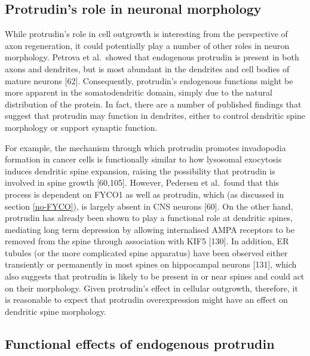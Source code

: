 \documentclass[
  12pt,
  a4paper,
]{book}
\begin{document}
\hypertarget{protrudins-role-in-neuronal-morphology}{%
\subsection{Protrudin's role in neuronal morphology}\label{protrudins-role-in-neuronal-morphology}}

While protrudin's role in cell outgrowth is interesting from the perspective of axon regeneration, it could potentially play a number of other roles in neuron morphology. Petrova et al.~showed that endogenous protrudin is present in both axons and dendrites, but is most abundant in the dendrites and cell bodies of mature neurons {[}62{]}. Consequently, protrudin's endogenous functions might be more apparent in the somatodendritic domain, simply due to the natural distribution of the protein. In fact, there are a number of published findings that suggest that protrudin may function in dendrites, either to control dendritic spine morphology or support synaptic function.

For example, the mechanism through which protrudin promotes invadopodia formation in cancer cells is functionally similar to how lysosomal exocytosis induces dendritic spine expansion, raising the possibility that protrudin is involved in spine growth {[}60,105{]}. However, Pedersen et al.~found that this process is dependent on FYCO1 as well as protrudin, which (as discussed in section \ref{no-FYCO}), is largely absent in CNS neurons {[}60{]}. On the other hand, protrudin has already been shown to play a functional role at dendritic spines, mediating long term depression by allowing internalised AMPA receptors to be removed from the spine through association with KIF5 {[}130{]}. In addition, ER tubules (or the more complicated spine apparatus) have been observed either transiently or permanently in most spines on hippocampal neurons {[}131{]}, which also suggests that protrudin is likely to be present in or near spines and could act on their morphology. Given protrudin's effect in cellular outgrowth, therefore, it is reasonable to expect that protrudin overexpression might have an effect on dendritic spine morphology.

\hypertarget{functional-effects-of-endogenous-protrudin}{%
\subsection{Functional effects of endogenous protrudin}\label{functional-effects-of-endogenous-protrudin}}
\end{document}
